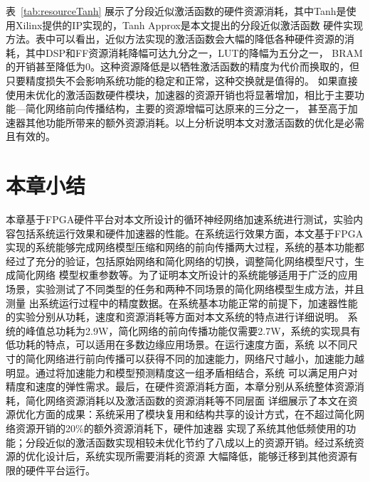 表~\ref{tab:resourceTanh} 展示了分段近似激活函数的硬件资源消耗，其中Tanh是使用Xilinx提供的IP实现的，Tanh Approx是本文提出的分段近似激活函数
硬件实现方法。表中可以看出，近似方法实现的激活函数会大幅的降低各种硬件资源的消耗，其中DSP和FF资源消耗降幅可达九分之一，LUT的降幅为五分之一，
BRAM的开销甚至降低为0。这种资源降低是以牺牲激活函数的精度为代价而换取的，但只要精度损失不会影响系统功能的稳定和正常，这种交换就是值得的。
如果直接使用未优化的激活函数硬件模块，加速器的资源开销也将显著增加，相比于主要功能---简化网络前向传播结构，主要的资源增幅可达原来的三分之一，
甚至高于加速器其他功能所带来的额外资源消耗。以上分析说明本文对激活函数的优化是必需且有效的。


\section{本章小结}

本章基于FPGA硬件平台对本文所设计的循环神经网络加速系统进行测试，实验内容包括系统运行效果和硬件加速器的性能。在系统运行效果方面，本文基于FPGA
实现的系统能够完成网络模型压缩和网络的前向传播两大过程，系统的基本功能都经过了充分的验证，包括原始网络和简化网络的切换，调整简化网络模型尺寸，生成简化网络
模型权重参数等。为了证明本文所设计的系统能够适用于广泛的应用场景，实验测试了不同类型的任务和两种不同场景的简化网络模型生成方法，并且测量
出系统运行过程中的精度数据。在系统基本功能正常的前提下，加速器性能的实验分别从功耗，速度和资源消耗等方面对本文系统的特点进行详细说明。
系统的峰值总功耗为2.9W，简化网络的前向传播功能仅需要2.7W，系统的实现具有低功耗的特点，可以适用在多数边缘应用场景。在运行速度方面，系统
以不同尺寸的简化网络进行前向传播可以获得不同的加速能力，网络尺寸越小，加速能力越明显。通过将加速能力和模型预测精度这一组矛盾相结合，系统
可以满足用户对精度和速度的弹性需求。最后，在硬件资源消耗方面，本章分别从系统整体资源消耗，简化网络资源消耗以及激活函数的资源消耗等不同层面
详细展示了本文在资源优化方面的成果：系统采用了模块复用和结构共享的设计方式，在不超过简化网络资源开销的20\%的额外资源消耗下，硬件加速器
实现了系统其他低频使用的功能；分段近似的激活函数实现相较未优化节约了八成以上的资源开销。经过系统资源的优化设计后，系统实现所需要消耗的资源
大幅降低，能够迁移到其他资源有限的硬件平台运行。







%
